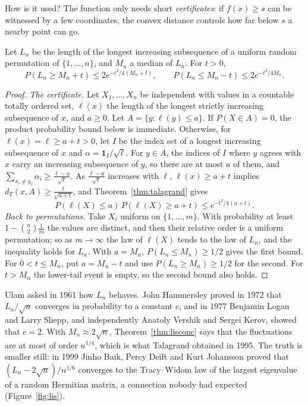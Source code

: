 How is it used? The function only needs short \emph{certificates}: if $f(x)\ge s$ can be witnessed by a few coordinates, the convex distance controls how far below $s$
a nearby point can go.

\begin{theorem}\label{thm:lisconc}
Let $L_n$ be the length of the longest increasing subsequence of a uniform random permutation of $\{1,\dots,n\}$, and $M_n$ a median of $L_n$. For $t>0$,
\[
P(L_n\ge M_n+t)\le2e^{-t^2/4(M_n+t)},\qquad P(L_n\le M_n-t)\le2e^{-t^2/4M_n}.
\]
\end{theorem}
\begin{proof}
\emph{The certificate.} Let $X_1,\dots,X_n$ be independent with values in a countable totally ordered set, $\ell(x)$ the length of the longest strictly increasing subsequence of
$x$, and $a\ge0$. Let $A=\{y:\ell(y)\le a\}$. If $P(X\in A)=0$, the product probability bound below is immediate. Otherwise, for $\ell(x)=\ell\ge a+t>0$, let $I$ be the index set of a longest increasing subsequence of $x$ and $\alpha=\mathbf 1_I/\sqrt\ell$. For $y\in A$, the indices of $I$
where $y$ agrees with $x$ carry an increasing subsequence of $y$, so there are at most $a$ of them, and $\sum_{x_i\ne y_i}\alpha_i\ge\frac{\ell-a}{\sqrt\ell}$. As $\frac{\ell-a}{\sqrt\ell}$ increases with $\ell$,
$\ell(x)\ge a+t$ implies $d_T(x,A)\ge\frac t{\sqrt{a+t}}$, and Theorem~\ref{thm:talagrand} gives
\[
P(\ell(X)\le a)\,P(\ell(X)\ge a+t)\le e^{-t^2/4(a+t)}.
\]
\emph{Back to permutations.} Take $X_i$ uniform on $\{1,\dots,m\}$. With probability at least $1-\binom n2\frac1m$ the values are distinct, and then their relative order is a uniform permutation;
so as $m\to\infty$ the law of $\ell(X)$ tends to the law of $L_n$, and the inequality holds for $L_n$. With $a=M_n$, $P(L_n\le M_n)\ge1/2$ gives the first bound. For $0<t\le M_n$, put $a=M_n-t$ and use $P(L_n\ge M_n)\ge1/2$ for the second. For $t>M_n$ the lower-tail event is empty, so the second bound also holds.
\end{proof}

Ulam asked in 1961 how $L_n$ behaves. John Hammersley proved in 1972 that $L_n/\sqrt n$ converges in probability to a constant $c$, and in 1977 Benjamin Logan and Larry Shepp, and
independently Anatoly Vershik and Sergei Kerov, showed that $c=2$. With $M_n\approx2\sqrt n$, Theorem~\ref{thm:lisconc} says that the fluctuations are at most of order
$n^{1/4}$, which is what Talagrand obtained in 1995. The truth is smaller still: in 1999 Jinho Baik, Percy Deift and Kurt Johansson proved that
$(L_n-2\sqrt n)/n^{1/6}$ converges to the Tracy--Widom law of the largest eigenvalue of a random Hermitian matrix, a connection nobody had expected (Figure~\ref{fig:lis}).

